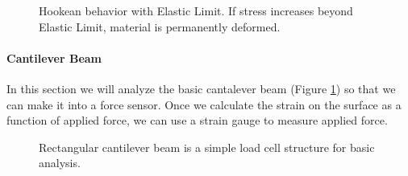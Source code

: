 \begin{figure}[ht]	%
\begin{center}
\caption{Hookean behavior with Elastic Limit.  If stress increases	%
beyond Elastic Limit, material is permanently deformed. }	%
\end{center}
\end{figure}	%


\paragraph{Cantilever Beam}

In this section we will analyze the basic cantalever beam (Figure \ref{cantaleverbeam}) so that we can make it into a force sensor.  Once we calculate the strain on the surface as a function of applied force, we can use a strain gauge to measure applied force.


\begin{figure}[ht]	%
\begin{center}
\caption{ Rectangular cantilever beam is a simple load cell	%
structure for basic analysis. }\label{cantaleverbeam}
\end{center}
\end{figure}	%

